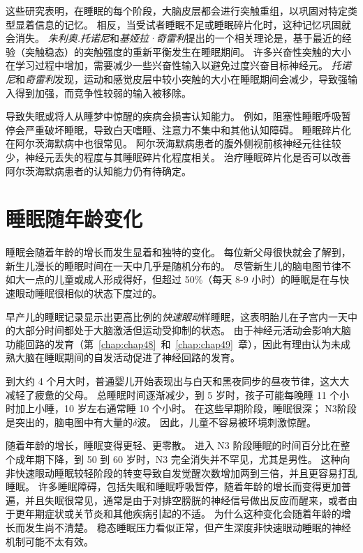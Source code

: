 这些研究表明，在睡眠的每个阶段，大脑皮层都会进行突触重组，以巩固对特定类型显着信息的记忆。
相反，当受试者睡眠不足或睡眠碎片化时，这种记忆巩固就会消失。
\textit{朱利奥.托诺尼}和\textit{基娅拉·奇雷利}提出的一个相关理论是，基于最近的经验（突触稳态）的突触强度的重新平衡发生在睡眠期间。
许多兴奋性突触的大小在学习过程中增加，需要减少一些兴奋性输入以避免过度兴奋目标神经元。
\textit{托诺尼}和\textit{奇雷利}发现，运动和感觉皮层中较小突触的大小在睡眠期间会减少，导致强输入得到加强，而竞争性较弱的输入被移除。


导致失眠或将人从睡梦中惊醒的疾病会损害认知能力。
例如，阻塞性睡眠呼吸暂停会严重破坏睡眠，导致白天嗜睡、注意力不集中和其他认知障碍。
睡眠碎片化在阿尔茨海默病中也很常见。
阿尔茨海默病患者的腹外侧视前核神经元往往较少，神经元丢失的程度与其睡眠碎片化程度相关。
治疗睡眠碎片化是否可以改善阿尔茨海默病患者的认知能力仍有待确定。



\section{睡眠随年龄变化}

睡眠会随着年龄的增长而发生显着和独特的变化。
每位新父母很快就会了解到，新生儿漫长的睡眠时间在一天中几乎是随机分布的。
尽管新生儿的脑电图节律不如大一点的儿童或成人形成得好，但超过 50\%（每天 8-9 小时）的睡眠是在与快速眼动睡眠很相似的状态下度过的。


早产儿的睡眠记录显示出更高比例的\textit{快速眼动}样睡眠，这表明胎儿在子宫内一天中的大部分时间都处于大脑激活但运动受抑制的状态。
由于神经元活动会影响大脑功能回路的发育（第~\ref{chap:chap48}~和~\ref{chap:chap49}~章），因此有理由认为未成熟大脑在睡眠期间的自发活动促进了神经回路的发育。


到大约 4 个月大时，普通婴儿开始表现出与白天和黑夜同步的昼夜节律，这大大减轻了疲惫的父母。
总睡眠时间逐渐减少，到 5 岁时，孩子可能每晚睡 11 个小时加上小睡，10 岁左右通常睡 10 个小时。
在这些早期阶段，睡眠很深；
N3阶段是突出的，脑电图中有大量的$ \delta $波。
因此，儿童不容易被环境刺激惊醒。


随着年龄的增长，睡眠变得更轻、更零散。
进入 N3 阶段睡眠的时间百分比在整个成年期下降，到 50 到 60 岁时，N3 完全消失并不罕见，尤其是男性。
这种向非快速眼动睡眠较轻阶段的转变导致自发觉醒次数增加两到三倍，并且更容易打乱睡眠。
许多睡眠障碍，包括失眠和睡眠呼吸暂停，随着年龄的增长而变得更加普遍，并且失眠很常见，通常是由于对排空膀胱的神经信号做出反应而醒来，或者由于更年期症状或关节炎和其他疾病引起的不适。
为什么这种变化会随着年龄的增长而发生尚不清楚。
稳态睡眠压力看似正常，但产生深度非快速眼动睡眠的神经机制可能不太有效。



